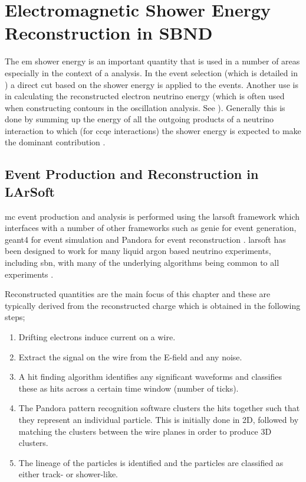 \chapter{Electromagnetic Shower Energy Reconstruction in SBND}
\label{chap:Energy_Reco}

The \gls{em} shower energy is an important quantity that is used in a number of areas especially in the context of a \nue analysis. In the \nue event selection (which is detailed in ) a direct cut based on the shower energy is applied to the events. Another use is in calculating the reconstructed electron neutrino energy (which is often used when constructing contours in the oscillation analysis. See ). Generally this is done by summing up the energy of all the outgoing products of a neutrino interaction to which (for \nue \gls{ccqe} interactions) the shower energy is expected to make the dominant contribution \cite{neutrino_energy_reconstruction}.

\section{Event Production and Reconstruction in LArSoft}\label{sec:Event Production and Reconstruction in LArSoft}

\gls{mc} event production and analysis is performed using the \gls{larsoft} framework which interfaces with a number of other frameworks such as \gls{genie} for event generation, \gls{geant4} for event simulation and Pandora for event reconstruction \cite{GENIE}\cite{Geant4_website}\cite{Geant4_paper}\cite{Pandora_paper}. \gls{larsoft} has been designed to work for many liquid argon based neutrino experiments, including \gls{sbn}, with many of the underlying algorithms being common to all experiments \cite{larsoft}\cite{larsoft_paper}.

Reconstructed quantities are the main focus of this chapter and these are typically derived from the reconstructed charge which is obtained in the following steps;
\begin{enumerate}
    \item Drifting electrons induce current on a wire.
    \item Extract the signal on the wire from the E-field and any noise. 
    \item A hit finding algorithm identifies any significant waveforms and classifies these as hits across a certain time window (number of ticks). 
    \item The Pandora pattern recognition software clusters the hits together such that they represent an individual particle. This is initially done in 2D, followed by matching the clusters between the wire planes in order to produce 3D clusters.
    \item The lineage of the particles is identified and the particles are classified as either track- or shower-like.
\end{enumerate}

